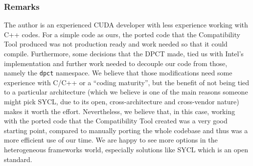 \documentclass[../main]{subfiles}
\begin{document}
\subsubsection{Remarks}\label{sec:dgpoly3d_remarks}
The author is an experienced CUDA developer with less experience working with C++ codes.
For a simple code as ours, the ported code that the Compatibility Tool produced was not production ready and work needed so that it could compile.
Furthermore, some decisions that the DPCT made, tied us with Intel's implementation and further work needed to decouple our code from those, namely the \texttt{dpct} namespace.
We believe that those modifications need some experience with C/C++ or a ``coding maturity'', but the benefit of not being tied to a particular architecture (which we believe is one of the main reasons someone might pick SYCL, due to its open, cross-architecture and cross-vendor nature) makes it worth the effort.
Nevertheless, we believe that, in this case, working with the ported code that the Compatibility Tool created was a very good starting point, compared to manually porting the whole codebase and thus was a more efficient use of our time.
We are happy to see more options in the heterogeneous frameworks world, especially solutions like SYCL which is an open standard.
\end{document}
